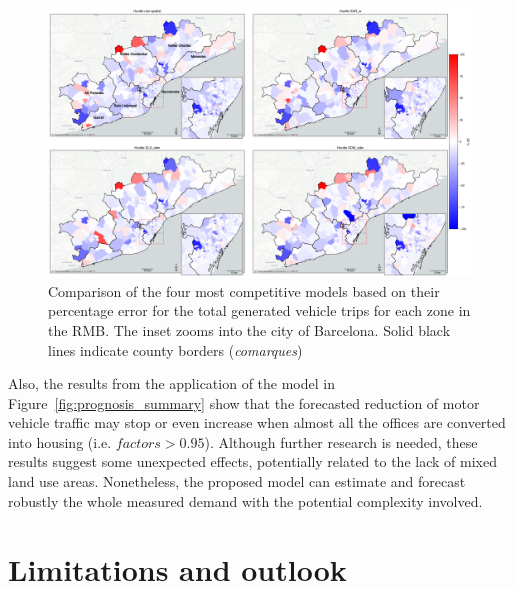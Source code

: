 \begin{figure}[h!]
    \centering
    \includegraphics[width=1\textwidth]{fig_generated_perc_diff_SDM_v4.png}
    \caption{Comparison of the four most competitive models based on their percentage error for the total generated vehicle trips for each zone in the RMB. The inset zooms into the city of Barcelona. Solid black lines indicate county borders (\textit{comarques})}
    \label{fig:maps_4models_perfectage_error_generated}
\end{figure}

Also, the results from the application of the model in Figure~\ref{fig:prognosis_summary} show that the forecasted reduction of motor vehicle traffic may stop or even increase when almost all the offices are converted into housing (i.e. $\textit{factors}>0.95$). Although further research is needed, these results suggest some unexpected effects, potentially related to the lack of mixed land use areas.
Nonetheless, the proposed model can estimate and forecast robustly the whole measured demand with the potential complexity involved. 

\section{Limitations and outlook}
\label{sec:ETRCO2H_Limitations}


